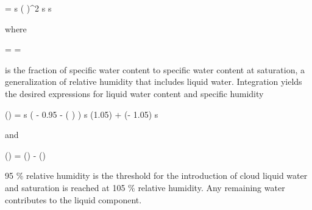     \startformula
        \DERIV{\QLIQ}{\RHL} = \QSAT \startcases
             \MC s  \NR
            \NC \cos \left(   \right)^2
                 \le s  \EQCOMMA \NR
              \lt s \NR
        \stopcases
    \stopformula

    where

    \startformula
        \RHL = \frac{\QTOT}{\QSAT} = \frac{\QVAP + \QLIQ}{\QSAT}
    \stopformula

    is the fraction of specific water content to specific water content at
    saturation, a generalization of relative humidity that includes liquid
    water. Integration yields the desired expressions for liquid water content
    and specific humidity

    \placeformula
    \startformula
    \startalign[align={center,right}]
        \NC
        \QLIQ(\RHL) = \startcases[align={left,left,right}]
             \MC s  \NR
            \NC {} \left( \RHL - 0.95 - 
                \cos \left(  \right) \right)
                 \le s  \NR
            \NC \QLIQ(1.05) + \QSAT (\RHL - 1.05)  \lt s \NR
        \stopcases \NC \NR[eq:qliq]
    \stopalign
    \stopformula

    and

    \placeformula[eq:qvap]
    \startformula
        \QVAP(\RHL) = \QTOT(\RHL) - \QLIQ(\RHL) \EQSTOP
    \stopformula

    95 \% relative humidity is the threshold for the introduction of
    cloud liquid water and saturation is reached at 105 \% relative humidity.
    Any remaining water contributes to the liquid component.

